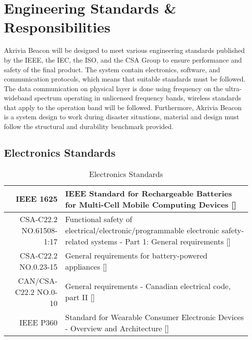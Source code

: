 %

\setcounter{section}{3}
\section{Engineering Standards \& Responsibilities}
\bigskip
Akrivia Beacon will be designed to meet various engineering standards published by the IEEE, the IEC, the ISO, and the CSA Group to ensure performance and safety of the final product. The system contain electronics, software, and communication protocols, which means that suitable standards must be followed. The data communication on physical layer is done using frequency on the ultra-wideband spectrum operating in unlicensed frequency bands, wireless standards that apply to the operation band will be followed. Furthermore, Akrivia Beacon is a system design to work during disaster situations, material and design must follow the structural and durability benchmark provided. 


\subsection{Electronics Standards}
\bgroup
\def\arraystretch{1.5}
\begin{table}[H]
\centering
\begin{tabular}{ |p{3cm} p{11cm} | }
\hline
\multicolumn{1}{|r|}{IEEE 1625} & IEEE Standard for Rechargeable Batteries for Multi-Cell Mobile Computing Devices []\\ 
\hline
\multicolumn{1}{|r|}{CSA-C22.2 NO.61508-1:17} & Functional safety of electrical/electronic/programmable electronic safety-related systems - Part 1: General requirements []\\ 
\hline
\multicolumn{1}{|r|}{CSA-C22.2 NO.0.23-15} & General requirements for battery-powered appliances []\\  
\hline
\multicolumn{1}{|r|}{CAN/CSA-C22.2 NO.0-10} & General requirements - Canadian electrical code, part II []\\ 
\hline
\multicolumn{1}{|r|}{IEEE P360} & Standard for Wearable Consumer Electronic Devices - Overview and Architecture [] \\  
\hline
\end{tabular}
\caption{Electronics Standards}
\end{table}	
\medskip


